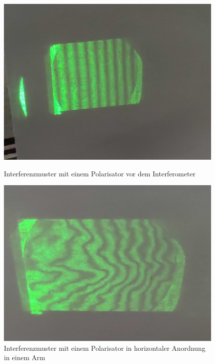 \documentclass[ngerman]{scrartcl}
\begin{document}
\begin{figure}[H]
    \centering
    \begin{minipage}[t]{0.45\linewidth}
        \centering
        \includegraphics[width=\linewidth]{fig/Compressed/Out_horizontal_detail.jpg} %
        \caption{Interferenzmuster mit einem Polarisator vor dem Interferometer}
        \label{fig:michelson_pol_vor}
    \end{minipage}%
    \hspace*{\fill}
    \begin{minipage}[t]{0.45\linewidth}
        \centering
        \includegraphics[width=\linewidth]{fig/Compressed/Arago_horizontal_detail.jpg}
        \caption{Interferenzmuster mit einem Polarisator in horizontaler Anordnung in einem Arm}
        \label{fig:michelson_pol_1_horizontal}
    \end{minipage}
\end{figure}
\setcaphanging
\end{document}
